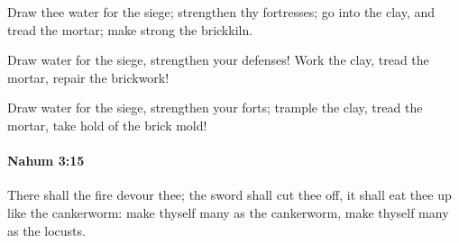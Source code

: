 			\begin{versebox}
					\item[BHS] 
					\item[LXX] 
					\item[ASV] Draw thee water for the siege; strengthen thy fortresses; go into the clay, and tread the mortar; make strong the brickkiln.
					\item[NIV] Draw water for the siege, strengthen your defenses! Work the clay, tread the mortar, repair the brickwork!
					\item[NRSV] Draw water for the siege, strengthen your forts; trample the clay, tread the mortar, take hold of the brick mold!
			\end{versebox}

		\paragraph{Nahum 3:15} %
			\label{NAHUM-3-15}

			There shall the fire devour thee; the sword shall cut thee off, it shall eat thee up like the cankerworm: make thyself many as the cankerworm, make thyself many as the locusts.

